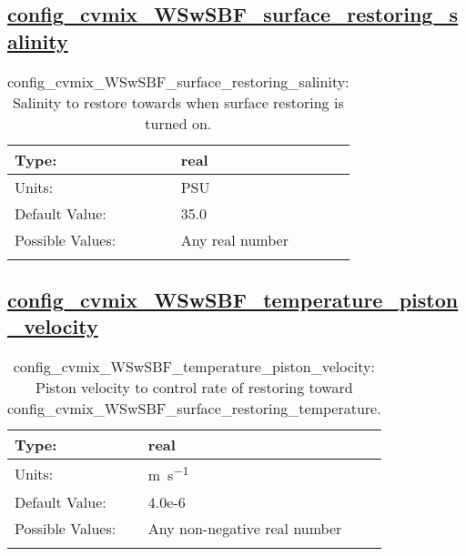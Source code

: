 \subsection[config\_cvmix\_WSwSBF\_surface\_restoring\_salinity]{\hyperref[sec:nm_tab_cvmix_WSwSBF]{config\_cvmix\_WSwSBF\_surface\_restoring\_salinity}}
\label{subsec:nm_sec_config_cvmix_WSwSBF_surface_restoring_salinity}
\begin{center}
\begin{longtable}{| p{2.0in} || p{4.0in} |}
    \hline
    Type: & real \\
    \hline
    Units: & \si{PSU} \\
    \hline
    Default Value: & 35.0 \\
    \hline
    Possible Values: & Any real number \\
    \hline
    \caption{config\_cvmix\_WSwSBF\_surface\_restoring\_salinity: Salinity to restore towards when surface restoring is turned on.}
\end{longtable}
\end{center}
\subsection[config\_cvmix\_WSwSBF\_temperature\_piston\_velocity]{\hyperref[sec:nm_tab_cvmix_WSwSBF]{config\_cvmix\_WSwSBF\_temperature\_piston\_velocity}}
\label{subsec:nm_sec_config_cvmix_WSwSBF_temperature_piston_velocity}
\begin{center}
\begin{longtable}{| p{2.0in} || p{4.0in} |}
    \hline
    Type: & real \\
    \hline
    Units: & \si{m.s^{-1}} \\
    \hline
    Default Value: & 4.0e-6 \\
    \hline
    Possible Values: & Any non-negative real number \\
    \hline
    \caption{config\_cvmix\_WSwSBF\_temperature\_piston\_velocity: Piston velocity to control rate of restoring toward config\_cvmix\_WSwSBF\_surface\_restoring\_temperature.}
\end{longtable}
\end{center}
